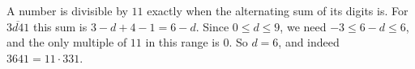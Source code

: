 A number is divisible by $11$ exactly when the alternating sum of its digits is. For $\overline{3d41}$ this sum is $3-d+4-1=6-d$. Since $0\le d\le9$, we need $-3\le6-d\le6$, and the only multiple of $11$ in this range is $0$. So $d=\boxed{6}$, and indeed $3641=11\cdot331$.
